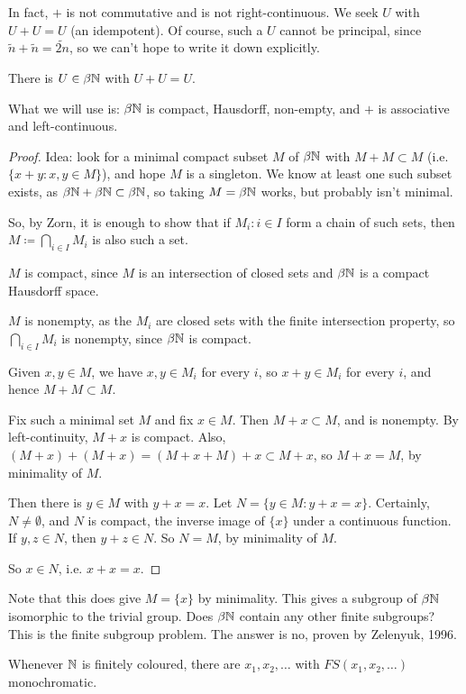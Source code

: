 \documentclass[10pt,a4paper]{article}
\begin{document}
In fact, $+$ is not commutative and is not right-continuous. We seek $U$ with $U+U = U$ (an idempotent). Of course, such a $U$ cannot be principal, since $\tilde{n} + \tilde{n} = \tilde{2n}$, so we can't hope to write it down explicitly.

\begin{lemma}
  There is $U \in \beta \mathbb{N}$ with $U+U = U$.
\end{lemma}
What we will use is: $\beta \mathbb{N}$ is compact, Hausdorff, non-empty, and $+$ is associative and left-continuous.
\begin{proof}
  Idea: look for a minimal compact subset $M$ of $\beta \mathbb{N}$ with $M+M \subset M$ (i.e. $\{x+y:x, y \in M\}$), and hope $M$ is a singleton. We know at least one such subset exists, as $\beta \mathbb{N} + \beta \mathbb{N} \subset \beta \mathbb{N}$, so taking $M = \beta\mathbb{N}$ works, but probably isn't minimal.

  So, by Zorn, it is enough to show that if $M_i: i \in I$ form a chain of such sets, then $M \coloneqq \bigcap_{i \in I} M_i$ is also such a set.

  $M$ is compact, since $M$ is an intersection of closed sets and $\beta \mathbb{N}$ is a compact Hausdorff space.

  $M$ is nonempty, as the $M_i$ are closed sets with the finite intersection property, so $\bigcap_{i \in I} M_i$ is nonempty, since $\beta \mathbb{N}$ is compact.

  Given $x, y \in M$, we have $x, y \in M_i$ for every $i$, so $x+y \in M_i$ for every $i$, and hence $M + M \subset M$.

  Fix such a minimal set $M$ and fix $x \in M$. Then $M+x \subset M$, and is nonempty. By left-continuity, $M+x$ is compact. Also, $(M+x)+(M+x) =(M+x+M)+x \subset M+x$, so $M+x = M$, by minimality of $M$.

  Then there is $y \in M$ with $y+x = x$. Let $N = \{y \in M : y+x = x\}$. Certainly, $N \neq \emptyset$, and $N$ is compact, the inverse image of $\{x\}$ under a continuous function. If $y, z \in N$, then $y+z \in N$. So $N = M$, by minimality of $M$.

  So $x \in N$, i.e. $x+x= x$.
\end{proof}
Note that this does give $M =\{x\}$ by minimality. This gives a subgroup of $\beta \mathbb{N}$ isomorphic to the trivial group. Does $\beta \mathbb{N}$ contain any other finite subgroups? This is the finite subgroup problem. The answer is no, proven by Zelenyuk, 1996.
\begin{theorem}[Hindman]
  Whenever $\mathbb{N}$ is finitely coloured, there are $x_1, x_2, \ldots$ with $FS(x_1, x_2, \ldots)$ monochromatic.
\end{theorem}
\end{document}
